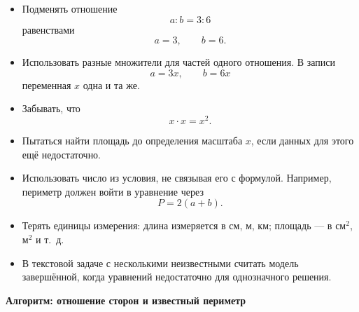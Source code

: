 \documentclass[a4paper,12pt]{article}
\begin{document}
\begin{itemize}
  \item Подменять отношение
  \[
  a:b=3:6
  \]
  равенствами
  \[
  a=3,
  \qquad
  b=6.
  \]

  \item Использовать разные множители для частей одного отношения. В записи
  \[
  a=3x,
  \qquad
  b=6x
  \]
  переменная $x$ одна и та же.

  \item Забывать, что
  \[
  x\cdot x=x^2.
  \]

  \item Пытаться найти площадь до определения масштаба $x$, если данных для этого ещё недостаточно.

  \item Использовать число из условия, не связывая его с формулой. Например, периметр должен войти в уравнение через
  \[
  P=2(a+b).
  \]

  \item Терять единицы измерения: длина измеряется в см, м, км; площадь --- в см$^2$, м$^2$ и т.~д.

  \item В текстовой задаче с несколькими неизвестными считать модель завершённой, когда уравнений недостаточно для однозначного решения.
\end{itemize}


\clearpage
\thispagestyle{plain}

\begin{center}
{\Large\bfseries\color{darkaccent}
Алгоритм: отношение сторон и известный периметр
}
\end{center}

\vspace{5mm}
\end{document}
